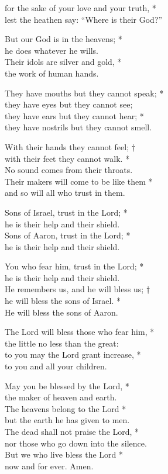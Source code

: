for the sake of your love and your truth, *\\
lest the heathen say: “Where is their God?”

But our God is in the heavens; *\\
he does whatever he wills.\\
Their idols are silver and gold, *\\
the work of human hands.

They have mouths but they cannot speak; *\\
they have eyes but they cannot see;\\
they have ears but they cannot hear; *\\
they have nostrils but they cannot smell.

With their hands they cannot feel; †\\
with their feet they cannot walk. *\\
No sound comes from their throats.\\
Their makers will come to be like them *\\
and so will all who trust in them.

Sons of Israel, trust in the Lord; *\\
he is their help and their shield.\\
Sons of Aaron, trust in the Lord; *\\
he is their help and their shield.

You who fear him, trust in the Lord; *\\
he is their help and their shield.\\
He remembers us, and he will bless us; †\\
he will bless the sons of Israel. *\\
He will bless the sons of Aaron.

The Lord will bless those who fear him, *\\
the little no less than the great:\\
to you may the Lord grant increase, *\\
to you and all your children.

May you be blessed by the Lord, *\\
the maker of heaven and earth.\\
The heavens belong to the Lord *\\
but the earth he has given to men.\\

The dead shall not praise the Lord, *\\
nor those who go down into the silence.\\
But we who live bless the Lord *\\
now and for ever. Amen.


